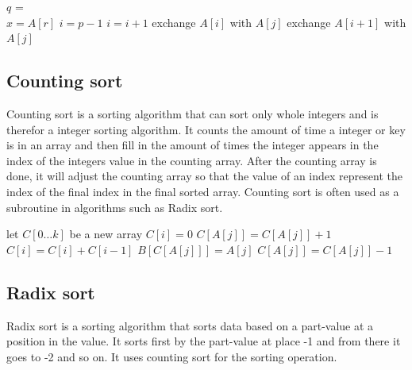 \documentclass[a4paper, 10pt]{article}
\begin{document}
\begin{algorithmic}
\begin{algorithmic}
        \State $q$ = 
        \State {}
        \State {}
\EndIf
\EndFunction \\

        \State $x = A[r]$
        \State $i = p - 1$
                        \State $i = i + 1$
                        \State exchange $A[i]$ with $A[j]$
                \EndIf
        \EndFor
\State exchange $A[i + 1]$ with $A[j]$
\State {}
\EndFunction
\end{algorithmic}

\subsection{Counting sort}
Counting sort is a sorting algorithm that can sort only whole integers and is therefor a integer sorting algorithm. It counts the amount of time a integer or key is in an array and then fill in the amount of times the integer appears in the index of the integers value in the counting array. After the counting array is done, it will adjust the counting array so that the value of an index represent the index of the final index in the final sorted array.
Counting sort is often used as a subroutine in algorithms such as Radix sort.
\\

\begin{algorithmic}
\State let $C[0 \dots k]$ be a new array
\State $C[i]=0$
\EndFor
{}
\State $C[A[j]] = C[A[j]] + 1$
\EndFor
{}
\State $C[i] = C[i] + C[i -1]$
\EndFor
{}
\State $B[C[A[j]]] = A[j]$
\State $C[A[j]] = C[A[j]] - 1$
\EndFor
\EndFunction
\end{algorithmic}

\subsection{Radix sort}
Radix sort is a sorting algorithm that sorts data based on a part-value at a position in the value. It sorts first by the part-value at place -1 and from there it goes to -2 and so on. It uses counting sort for the sorting operation.
\\


\end{algorithmic}
\end{document}
